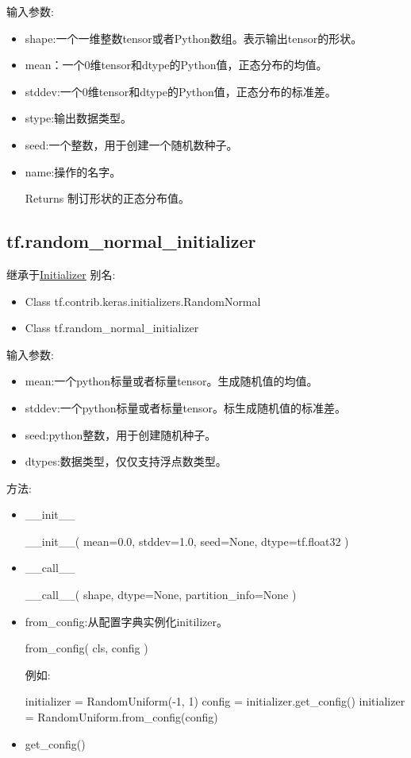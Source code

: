 输入参数:
\begin{itemize}
\item shape:一个一维整数tensor或者Python数组。表示输出tensor的形状。
\item mean：一个0维tensor和dtype的Python值，正态分布的均值。
\item stddev:一个0维tensor和dtype的Python值，正态分布的标准差。
\item stype:输出数据类型。
\item seed:一个整数，用于创建一个随机数种子。
\item name:操作的名字。
\item[Returns] 制订形状的正态分布值。
\end{itemize}
\subsection{\textbf{tf.random\_normal\_initializer}}
继承于\href{https://www.tensorflow.org/api_docs/python/tf/contrib/keras/initializers/Initializer}{Initializer}
别名:
\begin{itemize}
\item Class tf.contrib.keras.initializers.RandomNormal
\item Class tf.random\_normal\_initializer
\end{itemize}
输入参数:
\begin{itemize}
\item mean:一个python标量或者标量tensor。生成随机值的均值。
\item stddev:一个python标量或者标量tensor。标生成随机值的标准差。
\item seed:python整数，用于创建随机种子。
\item dtypes:数据类型，仅仅支持浮点数类型。
\end{itemize}
方法:
\begin{itemize}
\item \_\_init\_\_
\begin{python}
__init__(
    mean=0.0,
    stddev=1.0,
    seed=None,
    dtype=tf.float32
)
\end{python}
\item \_\_call\_\_
\begin{python}
__call__(
    shape,
    dtype=None,
    partition_info=None
)
\end{python}
\item from\_config:从配置字典实例化initilizer。
\begin{python}
from_config(
    cls,
    config
)
\end{python}
例如:
\begin{python}
initializer = RandomUniform(-1, 1)
config = initializer.get_config()
initializer = RandomUniform.from_config(config)
\end{python}
\item get\_config()
\end{itemize}
